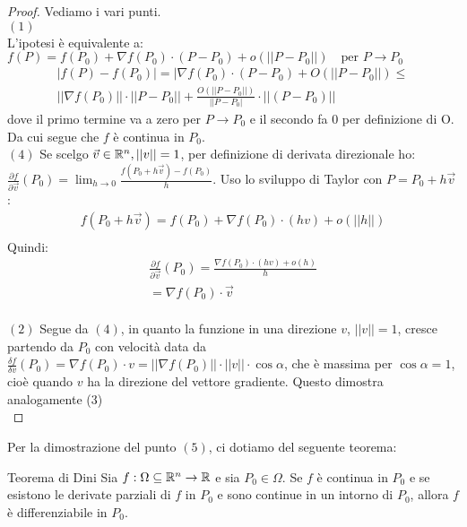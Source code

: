 \begin{proof}
  Vediamo i vari punti.\\
  $(1)$\\
  L'ipotesi è equivalente a:
  $f(P)=f(P_0)+\nabla f(P_0)\cdot (P-P_0)+o(||P-P_0||) \quad \text{per } P \rightarrow P_0$\\
  \begin{gather*}
 |f(P) - f(P_0)|= |\nabla f(P_0)\cdot(P-P_0)+O(||P-P_0||)\leq\\||\nabla f(P_0) ||\cdot|| P-P_0||+\frac{O(||P-P_0||)}{||P-P_0|}\cdot ||(P-P_0)||
  \end{gather*}
  dove il primo termine va a zero per $P\rightarrow P_0$ e il secondo fa 0 per definizione di O. Da cui segue che $f$ è continua in $P_0$.\\
  \newline
  $(4)$
  Se scelgo $\vec{v}\in \mathbb{R}^n, ||v||=1$, per definizione di derivata direzionale ho: $\frac{\partial f}{\partial \vec{v}}(P_0) = \lim_{h \to 0} \frac{f(P_0 + h\vec{v}) - f(P_0)}{h}$. Uso lo sviluppo di Taylor con  $P=P_0 + h\vec{v}$:
  \begin{gather*}
  f(P_0 + h\vec{v}) = f(P_0) + \nabla f(P_0)\cdot (hv) + o(||h||)\\
  \end{gather*}
  Quindi:
  \begin{gather*}
  \frac{\partial f}{\partial \vec{v}}(P_0)=\frac {\nabla f(P_0)\cdot (hv)+ o(h)}{h}\\=\nabla f(P_0)\cdot \vec{v}
  \end{gather*}\\
  \newline
  $(2)$ Segue da $(4)$, in quanto la funzione in una direzione $v$, $||v||=1$, cresce partendo da $P_0$ con velocità data da $\frac{\delta f}{\delta v}(P_0) = \nabla f(P_0)\cdot v = ||\nabla f(P_0)||\cdot ||v||\cdot \cos{\alpha}$, che è massima per $\cos{\alpha}=1$, cioè quando $v$ ha la direzione del vettore gradiente. Questo dimostra analogamente (3)\\

\end{proof}

Per la dimostrazione del punto $(5)$, ci dotiamo del seguente teorema:

\begin{teorema}{Teorema di Dini}
  Sia $f:\Omega \subseteq \mathbb{R}^n \rightarrow \mathbb{R}$ e sia $P_0 \in \Omega$. Se $f$ è continua in $P_0$ e se esistono le derivate parziali di $f$ in $P_0$ e sono continue in un intorno di $P_0$, allora $f$ è differenziabile in $P_0$.
\end{teorema}

